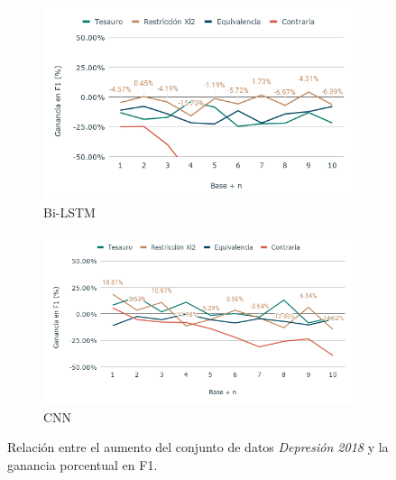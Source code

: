 \begin{figure}[hbt!]
    \begin{subfigure}[b]{0.5\textwidth}
        \includegraphics[width=\textwidth]{sections/figures/bi_LSTM2018.png}
        \caption{Bi-LSTM}
    \end{subfigure}
    \hfill
    \begin{subfigure}[b]{0.5\textwidth}
        \includegraphics[width=\textwidth]{sections/figures/CNN2018.png}
        \caption{CNN}
    \end{subfigure}
    
   
    \caption{Relación entre el aumento del conjunto de datos \textit{Depresión 2018} y la ganancia porcentual en F1.}
    \label{fig:aumento_n_depresion}
\end{figure}
